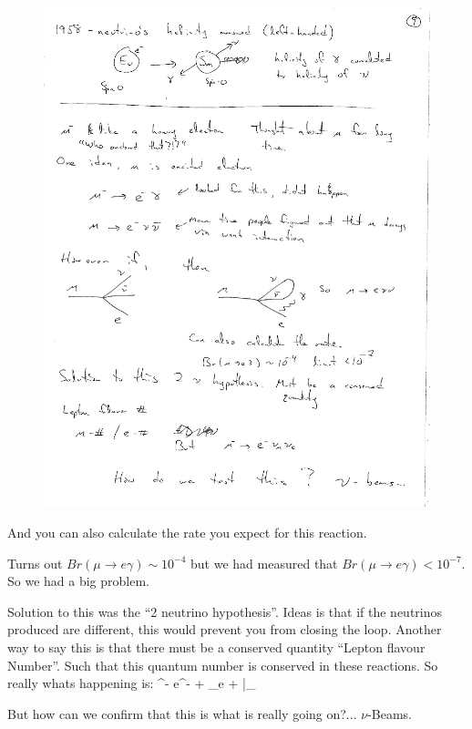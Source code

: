 {\begin{figure}[h!]
\centering
\includegraphics[width=1.0\textwidth]{./MuToEg.pdf}
\end{figure}

And you can also calculate the rate you expect for this reaction. 

Turns out $Br(\mu\rightarrow e \gamma) \sim 10^{-4}$ but we had measured that $Br(\mu\rightarrow e \gamma) < 10^{-7}$.
So we had a big problem. 

Solution to this was the ``2 neutrino hypothesis''. 
Ideas is that if the neutrinos produced are different, this would prevent you from closing the loop. 
Another way to say this is that there must be a conserved quantity ``Lepton flavour Number''. 
Such that this quantum number is conserved in these reactions.  
So really whats happening is:
\be
\mu^- \rightarrow e^- + \nu_e + \bar{\nu}_\mu
\ee

But how can we confirm that this is what is really going on?... $\nu$-Beams.

}
